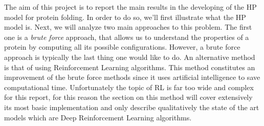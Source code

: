 The aim of this project is to report the main results in the developing of the HP model for protein folding.
In order to do so, we'll first illustrate what the HP model is.
Next, we will analyze two main approaches to this problem.
The first one is a \emph{brute force} approach, that allows us to understand the properties of a protein by computing all its possible configurations.
However, a brute force approach is typically the last thing one would like to do.
An alternative method is that of using Reinforcement Learning algorithms. This method constitutes an improvement of the brute force methods since it uses artificial intelligence to save computational time. 
Unfortunately the topic of RL is far too wide and complex for this report, for this reason the section on this method will cover extensively its most basic implementation and only describe qualitatively the state of the art models which are Deep Reinforcement Learning algorithms.
